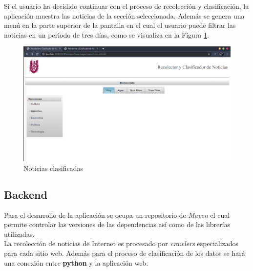 Si el usuario ha decidido continuar con el proceso de recolección y clasificación, la aplicación muestra las noticias de la sección seleccionada. Además se genera una menú en la parte superior de la pantalla en el cual el usuario puede filtrar las noticias en un periodo de tres días, como se visualiza en la Figura \ref{fig:mostrarNoticias}.
 
\begin{figure}[ht]
\centering
\includegraphics[scale=0.3]{imagenes/Aplicacion/mostrarNoticias.png}
\caption{Noticias clasificadas}
\label{fig:mostrarNoticias}
\end{figure}


\subsection{Backend}

Para el desarrollo de la aplicación se ocupa un repositorio de \textit{Maven} el cual permite controlar las versiones de las dependencias así como de las librerías utilizadas.\\

La recolección de noticias de Internet es procesado por \textit{crawlers} especializados para cada sitio web. Además para el proceso de clasificación de los datos se hará una conexión entre \textbf{python} y la aplicación web.







